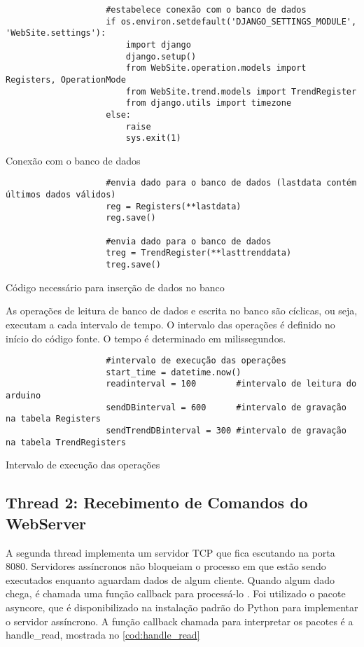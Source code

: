 				\begin{listing}[!htb]
					\begin{verbatim}
					#estabelece conexão com o banco de dados
					if os.environ.setdefault('DJANGO_SETTINGS_MODULE', 'WebSite.settings'):
						import django
						django.setup()
						from WebSite.operation.models import Registers, OperationMode
						from WebSite.trend.models import TrendRegister
						from django.utils import timezone
					else:
						raise
						sys.exit(1)
					\end{verbatim}
					\caption{Conexão com o banco de dados}
					\label{cod:connect_bd}
				\end{listing}
			
				\begin{listing}[!htb]
					\begin{verbatim}
					#envia dado para o banco de dados (lastdata contém últimos dados válidos)
					reg = Registers(**lastdata)
					reg.save()
					
					#envia dado para o banco de dados
					treg = TrendRegister(**lasttrenddata)
					treg.save()
					\end{verbatim}
					\caption{Código necessário para inserção de dados no banco}
					\label{cod:insert_data}
				\end{listing}
			
				As operações de leitura de banco de dados e escrita no banco são cíclicas, ou seja, executam a cada intervalo de tempo. O intervalo das operações é definido no início do código fonte. O tempo é determinado em milissegundos.
				
				\begin{listing}[!htb]
					\begin{verbatim}
					#intervalo de execução das operações
					start_time = datetime.now()
					readinterval = 100        #intervalo de leitura do arduino
					sendDBinterval = 600      #intervalo de gravação na tabela Registers
					sendTrendDBinterval = 300 #intervalo de gravação na tabela TrendRegisters
					\end{verbatim}
					\caption{Intervalo de execução das operações}
					\label{cod:set_interval}
				\end{listing}
			
			\subsection{Thread 2: Recebimento de Comandos do WebServer}
				A segunda thread implementa um servidor TCP que fica escutando na porta 8080. Servidores assíncronos não bloqueiam o processo em que estão sendo executados enquanto aguardam dados de algum cliente. Quando algum dado chega, é chamada uma função callback para processá-lo \cite{pythondoc}. Foi utilizado o pacote asyncore, que é disponibilizado na instalação padrão do Python para implementar o servidor assíncrono. A função callback chamada para interpretar os pacotes é a handle\_read, mostrada no \autoref{cod:handle_read}
				
